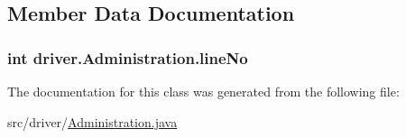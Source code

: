 \subsection{Member Data Documentation}
\subsubsection[{\texorpdfstring{line\+No}{lineNo}}]{\setlength{\rightskip}{0pt plus 5cm}int driver.\+Administration.\+line\+No}\hypertarget{classdriver_1_1Administration_a89a69f2397f1fb011677557ffa1c64fc}{}\label{classdriver_1_1Administration_a89a69f2397f1fb011677557ffa1c64fc}


The documentation for this class was generated from the following file\+:\begin{DoxyCompactItemize}
\item 
src/driver/\hyperlink{Administration_8java}{Administration.\+java}\end{DoxyCompactItemize}
